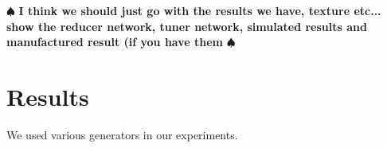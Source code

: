\documentclass[annual]{acmsiggraph}
\newcommand{\note}[1]{\marginpar{\LARGE $\spadesuit$}
			$\spadesuit$ {\bf #1} $\spadesuit$}
\begin{document}
%
%
%
%
%
%

\note{I think we should just go with the results we have, texture etc... show the reducer network, tuner network, simulated results and manufactured result (if you have them}
\section{Results}
We used various generators in our experiments.
\end{document}
